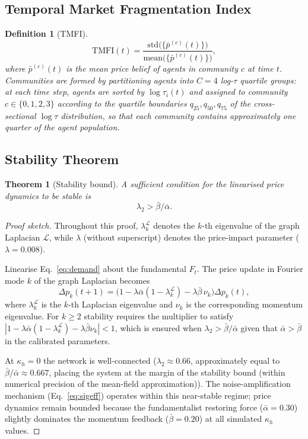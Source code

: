 \documentclass[10pt,twocolumn]{article}
\newtheorem{theorem}{Theorem}
\newtheorem{definition}{Definition}
\begin{document}
\subsection{Temporal Market Fragmentation Index}
\label{sec:tmfi}

\begin{definition}[TMFI]
\[
  \mathrm{TMFI}(t) =
    \frac{\mathrm{std}\bigl(\{\bar{p}^{(c)}(t)\}\bigr)}%
         {\mathrm{mean}\bigl(\{\bar{p}^{(c)}(t)\}\bigr)},
\]
where $\bar{p}^{(c)}(t)$ is the mean price belief of agents in community
$c$ at time $t$.  Communities are formed by partitioning agents into $C = 4$
log-$\tau$ quartile groups: at each time step, agents are sorted by
$\log \tau_i(t)$ and assigned to community $c \in \{0,1,2,3\}$ according to
the quartile boundaries $q_{25}, q_{50}, q_{75}$ of the cross-sectional
$\log \tau$ distribution, so that each community contains approximately
one quarter of the agent population.
\end{definition}

\subsection{Stability Theorem}

\begin{theorem}[Stability bound]
A sufficient condition for the linearised price dynamics to be stable is
\[
  \lambda_2 > \bar{\beta}/\bar{\alpha}.
\]
\end{theorem}

\begin{proof}[Proof sketch]
Throughout this proof, $\lambda_k^{\mathcal{L}}$ denotes the $k$-th eigenvalue of the graph Laplacian $\mathcal{L}$, while $\lambda$ (without superscript) denotes the price-impact parameter ($\lambda = 0.008$).

Linearise Eq.~\eqref{eq:demand} about the fundamental $F_t$.  The price
update in Fourier mode $k$ of the graph Laplacian becomes
\[
  \Delta p_k(t+1) =
    \bigl(1 - \lambda\bar{\alpha}(1 - \lambda_k^{\mathcal{L}})
           - \lambda\bar{\beta}\,\nu_k\bigr)\Delta p_k(t),
\]
where $\lambda_k^{\mathcal{L}}$ is the $k$-th Laplacian eigenvalue and
$\nu_k$ is the corresponding momentum eigenvalue.
For $k \geq 2$ stability requires the multiplier to satisfy
$|1 - \lambda\bar{\alpha}(1-\lambda_k^{\mathcal{L}}) - \lambda\bar{\beta}\nu_k| < 1$,
which is ensured when $\lambda_2 > \bar{\beta}/\bar{\alpha}$ given that
$\bar{\alpha} > \bar{\beta}$ in the calibrated parameters.

At $\kappa_h = 0$ the network is well-connected
($\lambda_2 \approx 0.66$, approximately equal to $\bar{\beta}/\bar{\alpha} \approx 0.667$, placing the system at the margin of the stability bound (within numerical precision of the mean-field approximation)).
The noise-amplification mechanism (Eq.~\eqref{eq:sigeff}) operates within
this near-stable regime; price dynamics remain bounded because the
fundamentalist restoring force ($\bar{\alpha} = 0.30$) slightly dominates
the momentum feedback ($\bar{\beta} = 0.20$) at all simulated $\kappa_h$
values.
\end{proof}
\end{document}
